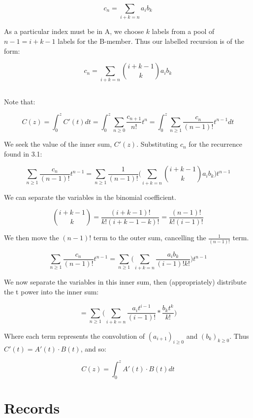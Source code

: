 \documentclass{article}
\begin{document}
$$c_n = \sum_{i + k = n} a_ib_k$$

As a particular index must be in A, we choose $k$ labels from a pool of $n-1 = i + k - 1$ labels for the B-member. Thus our labelled recursion is of the form:

$$c_n = \sum_{i + k = n} \binom{i + k - 1}{k}a_ib_k$$

\subsection{}

Note that:

$$C(z) =  \int_{0}^{z} C'(t) dt = \int_{0}^{z} \sum_{n \ge 0} \frac{c_{n+1}}{n!}t^{n}  = \int_{0}^{z} \sum_{n \ge 1} \frac{c_n}{(n-1)!}t^{n-1}  dt$$ 

We seek the value of the inner sum, $C'(z)$. Substituting $c_n$ for the recurrence found in 3.1:

$$\sum_{n \ge 1}\frac{c_n}{(n-1)!}t^{n-1}  = \sum_{n \ge 1}\frac{1}{(n-1)!} \bigg( \sum_{i + k = n} \binom{i + k - 1}{k}a_ib_k\bigg)t^{n-1}$$

We can separate the variables in the binomial coefficient.

$$\binom{i + k - 1}{k} = \frac{(i+k-1)!}{k!(i + k - 1 - k)!} = \frac{(n-1)!}{k!(i-1)!} $$

We then move the $(n-1)!$ term to the outer sum, cancelling the $\frac{1}{(n-1)!}$ term.

$$\sum_{n \ge 1}\frac{c_n}{(n-1)!}t^{n-1}  = \sum_{n \ge 1} \bigg( \sum_{i + k = n} \frac{a_ib_k}{(i-1)!k!}\bigg)t^{n-1}$$

We now separate the variables in this inner sum, then (appropriately) distribute the t power into the inner sum:

$$ = \sum_{n \ge 1} \bigg( \sum_{i + k = n} \frac{a_it^{i-1}}{(i-1)!} * \frac{b_kt^k}{k!}\bigg)$$

Where each term represents the convolution of $(a_{i+1})_{i \ge 0}$ and $(b_{k})_{k \ge 0}$. Thus $C'(t) = A'(t) \cdot B(t)$, and so:

$$C(z) = \int_{0}^{z} A'(t) \cdot B(t) dt$$

\section{Records}

\subsection{}
\end{document}
